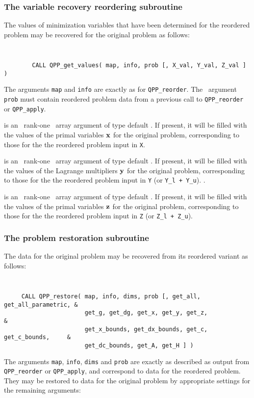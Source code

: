 \documentclass{galahad}
\newcommand{\packagename}{QPP}
\begin{document}

\subsubsection{The  variable recovery reordering subroutine}
The values of minimization variables that have been determined for the
reordered problem may be recovered for the original problem as follows:
\vspace*{-2mm}
{\tt
\begin{verbatim}
        CALL QPP_get_values( map, info, prob [, X_val, Y_val, Z_val ] )
\end{verbatim}
}
\vspace*{-1mm}
\noindent
The arguments {\tt map} and {\tt info} are exactly as for
{\tt \packagename\_reorder}.
The \intentin\ argument {\tt prob}
must contain reordered problem data from a previous call
to {\tt QPP\_reorder} or {\tt QPP\_apply}.

\begin{description}
 is an \optional\ rank-one \intentout\ array argument of
type default \realdp. If
present, it will be filled with the values of the primal variables ${\mathbf{x}}$
for the original problem, corresponding to those for the the reordered
problem input in {\tt X}.

 is an \optional\ rank-one \intentout\ array argument of
type default \realdp. If present,
it will be filled with the values of the Lagrange multipliers ${\mathbf{y}}$
for the original problem, corresponding to those for the the reordered
problem input in {\tt Y} (or {\tt Y\_l + Y\_u}).
.

 is an \optional\ rank-one \intentout\ array argument of
type default \realdp. If
present, it will be filled with the values of the primal variables ${\mathbf{z}}$
for the original problem, corresponding to those for the the reordered
problem input in {\tt Z} (or {\tt Z\_l + Z\_u}).
\end{description}


\subsubsection{The  problem restoration subroutine}
The data for the original problem may be recovered from its reordered
variant as follows:
\vspace*{-2mm}
{\tt
\begin{verbatim}
     CALL QPP_restore( map, info, dims, prob [, get_all, get_all_parametric, &
                       get_g, get_dg, get_x, get_y, get_z,                   &
                       get_x_bounds, get_dx_bounds, get_c, get_c_bounds,     &
                       get_dc_bounds, get_A, get_H ] )
\end{verbatim}
}
\vspace*{-1mm}
\noindent
The arguments {\tt map}, {\tt info}, {\tt dims} and {\tt prob} are
exactly as described as output from
{\tt \packagename\_reorder} or {\tt \packagename\_apply},
and correspond to data for the reordered problem.
They may be restored to data for the original problem by appropriate
settings for the remaining arguments:
\end{document}
